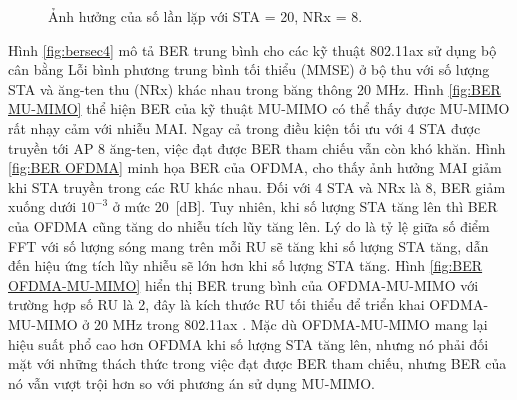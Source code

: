 \begin{figure}
    \centering
        
    \caption{Ảnh hưởng của số lần lặp với STA = 20, NRx = 8.}
    \label{fig:IT}
\end{figure}

Hình \ref{fig:bersec4} mô tả BER trung bình cho các kỹ thuật 802.11ax sử dụng bộ cân bằng Lỗi bình phương trung bình tối thiểu (\acrshort{MMSE}) ở bộ thu với số lượng STA và ăng-ten thu (NRx) khác nhau trong băng thông 20 MHz.
Hình \ref{fig:BER MU-MIMO} thể hiện BER của kỹ thuật MU-MIMO có thể thấy được MU-MIMO rất nhạy cảm với nhiễu MAI. Ngay cả trong điều kiện tối ưu với 4 STA được truyền tới AP 8 ăng-ten, việc đạt được BER tham chiếu vẫn còn khó khăn.
Hình \ref{fig:BER OFDMA} minh họa BER của OFDMA, cho thấy ảnh hưởng MAI giảm khi STA truyền trong các RU khác nhau. Đối với 4 STA và NRx là 8, BER giảm xuống dưới $10^{-3}$ ở mức 20~[dB]. Tuy nhiên, khi số lượng STA tăng lên thì BER của OFDMA cũng tăng do nhiễu tích lũy tăng lên. Lý do là tỷ lệ giữa số điểm FFT với số lượng sóng mang trên mỗi RU sẽ tăng khi số lượng STA tăng, dẫn đến hiệu ứng tích lũy nhiễu sẽ lớn hơn khi số lượng STA tăng.
Hình \ref{fig:BER OFDMA-MU-MIMO} hiển thị BER trung bình của OFDMA-MU-MIMO với trường hợp số RU là 2, đây là kích thước RU tối thiểu để triển khai OFDMA-MU-MIMO ở 20 MHz trong 802.11ax \cite{IEEEStd}. Mặc dù OFDMA-MU-MIMO mang lại hiệu suất phổ cao hơn OFDMA khi số lượng STA tăng lên, nhưng nó phải đối mặt với những thách thức trong việc đạt được BER tham chiếu, nhưng BER của nó vẫn vượt trội hơn so với phương án sử dụng MU-MIMO.

